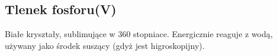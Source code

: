\subsection{Tlenek fosforu(V) }
Białe kryształy, sublimujące w 360 stopniace.
Energicznie reaguje z wodą, używany jako środek suszący (gdyż jest higroskopijny).
